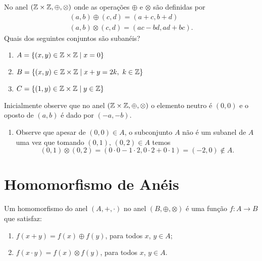 \begin{exemplo}
    No anel $(\mathbb{Z} \times \mathbb{Z}, \oplus, \otimes)$ onde as opera\c{c}\~oes $\oplus$ e $\otimes$ s\~ao definidas por
    \begin{align*}
        (a, b) \oplus (c, d) = (a + c, b + d)\\
        (a ,b) \otimes (c, d) = (ac - bd, ad + bc).
    \end{align*}
    Quais dos seguintes conjuntos s\~ao suban\'eis?
    \begin{enumerate}[label=({\alph*})]
        \item $A = \{(x, y) \in \mathbb{Z} \times \mathbb{Z} \mid x = 0\}$

        \item $B = \{(x, y) \in \mathbb{Z} \times \mathbb{Z} \mid x + y = 2k,\ k \in \mathbb{Z}\}$

        \item $C =  \{(1, y) \in \mathbb{Z} \times \mathbb{Z} \mid y \in \mathbb{Z}\}$
    \end{enumerate}
    \begin{solucao}
        Inicialmente observe que no anel $(\mathbb{Z} \times \mathbb{Z}, \oplus, \otimes)$ o elemento neutro é $(0,0)$ e o oposto de $(a, b)$ é dado por $(-a, -b)$.
        \begin{enumerate}
            \item Observe que apesar de $(0, 0) \in A$, o subconjunto $A$ não é um subanel de $A$ uma vez que tomando $(0, 1)$, $(0, 2) \in A$ temos
                \[
                    (0, 1) \otimes (0, 2) = (0\cdot 0 - 1\cdot 2, 0\cdot 2 + 0\cdot 1) = (-2, 0) \notin A.
                \]
        \end{enumerate}
    \end{solucao}
\end{exemplo}


\section{Homomorfismo de An\'eis} %
\label{sec:homomorfismo_de_aneis}

\begin{definicao}
	Um homomorfismo do anel $(A, +, \cdot)$ no anel $(B, \oplus, \otimes)$ {\'e} uma fun{\c c}{\~a}o $f : A \to B$ que satisfaz:
	\begin{enumerate}[label={\roman*})]
		\item $f(x + y) = f(x) \oplus f(y)$, para todos $x$, $y \in A$;
		\item $f(x \cdot y) = f(x)\otimes f(y)$, para todos $x$, $y \in A$.
	\end{enumerate}
\end{definicao}

